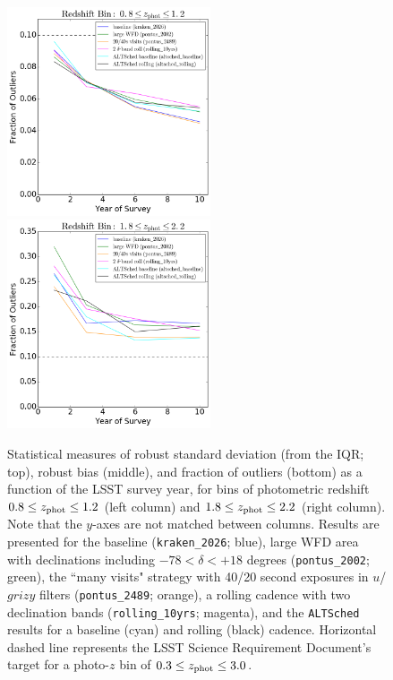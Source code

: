 \begin{figure}
\begin{center}
\includegraphics[width=6cm,trim={0cm 0cm 0cm 0cm},clip]{figures/zbin1_fout.png}
\includegraphics[width=6cm,trim={0cm 0cm 0cm 0cm},clip]{figures/zbin2_fout.png}
\caption{Statistical measures of robust standard deviation (from the IQR; top), robust bias (middle), and fraction of outliers (bottom) as a function of the LSST survey year, for bins of photometric redshift $0.8 \leq z_{\rm phot} \leq 1.2$ (left column) and  $1.8 \leq z_{\rm phot} \leq 2.2$ (right column). Note that the $y$-axes are not matched between columns. Results are presented for the baseline ({\tt kraken\_2026}; blue), large WFD area with declinations including  $-78<\delta<+18$ degrees ({\tt pontus\_2002}; green), the ``many visits" strategy with 40/20 second exposures in $u$/$grizy$ filters ({\tt pontus\_2489}; orange), a rolling cadence with two declination bands ({\tt rolling\_10yrs}; magenta), and the {\tt ALTSched} results for a baseline (cyan) and rolling (black) cadence. Horizontal dashed line represents the LSST Science Requirement Document's target for a photo-$z$ bin of $0.3 \leq z_{\rm phot} \leq 3.0$. \label{fig:evol}}
\end{center}
\end{figure}


